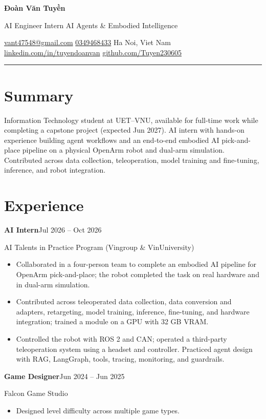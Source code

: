 \documentclass[10pt,a4paper]{article}
\newcommand{\entry}[4]{%
  \textbf{#1}\hfill{\small\color{muted}#2}\par
  {\color{accent}#3}\hfill{\small\color{muted}#4}\par
}
\begin{document}
{\fontsize{26}{30}\selectfont\bfseries\color{navy} Đoàn Văn Tuyền}\par
\vspace{1pt}
{\large\color{accent} AI Engineer Intern}\quad{\color{muted}|}\quad
{\normalsize\color{body}AI Agents \& Embodied Intelligence}\par
\vspace{6pt}
{\small
  \href{mailto:vant47548@gmail.com}{vant47548@gmail.com}\quad{\color{rule}|}\quad
  \href{tel:0349468433}{0349468433}\quad{\color{rule}|}\quad
  Ha Noi, Viet Nam\\[2pt]
  \href{https://www.linkedin.com/in/tuyendoanvan/}{linkedin.com/in/tuyendoanvan}
  \quad{\color{rule}|}\quad
  \href{https://github.com/Tuyen230605}{github.com/Tuyen230605}
}\par
\vspace{5pt}
{\color{accent}\rule{\textwidth}{1.2pt}}

\section{Summary}
Information Technology student at UET--VNU, available for full-time work while completing a capstone project (expected Jun 2027). AI intern with hands-on experience building agent workflows and an end-to-end embodied AI pick-and-place pipeline on a physical OpenArm robot and dual-arm simulation. Contributed across data collection, teleoperation, model training and fine-tuning, inference, and robot integration.

\section{Experience}
\entry{AI Intern}{Jul 2026 -- Oct 2026}{AI Talents in Practice Program (Vingroup \& VinUniversity)}{}
\begin{itemize}
  \item Collaborated in a four-person team to complete an embodied AI pipeline for OpenArm pick-and-place; the robot completed the task on real hardware and in dual-arm simulation.
  \item Contributed across teleoperated data collection, data conversion and adapters, retargeting, model training, inference, fine-tuning, and hardware integration; trained a module on a GPU with 32 GB VRAM.
  \item Controlled the robot with ROS 2 and CAN; operated a third-party teleoperation system using a headset and controller. Practiced agent design with RAG, LangGraph, tools, tracing, monitoring, and guardrails.
\end{itemize}
\entry{Game Designer}{Jun 2024 -- Jun 2025}{Falcon Game Studio}{}
\begin{itemize}
  \item Designed level difficulty across multiple game types.
\end{itemize}
\end{document}
